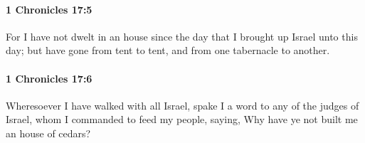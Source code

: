 		\paragraph{1 Chronicles 17:5} %
			\label{1CHRONICLES-17-5}

			For I have not dwelt in an house since the day that I brought up Israel unto this day; but have gone from tent to tent, and from one tabernacle to another.


		\paragraph{1 Chronicles 17:6} %
			\label{1CHRONICLES-17-6}

			Wheresoever I have walked with all Israel, spake I a word to any of the judges of Israel, whom I commanded to feed my people, saying, Why have ye not built me an house of cedars?


